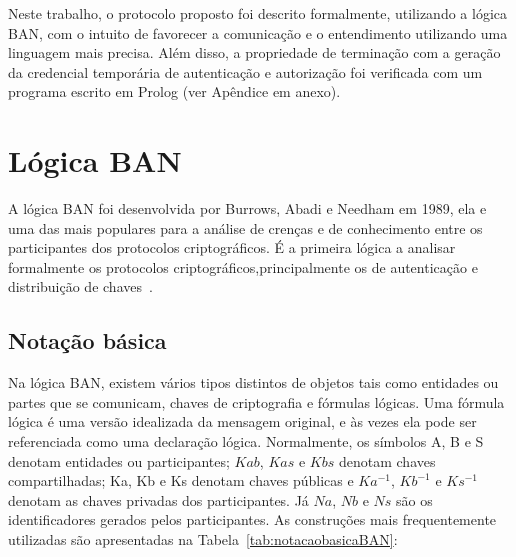 Neste trabalho, o protocolo proposto foi descrito formalmente, utilizando a lógica BAN, com o intuito de favorecer a comunicação e o entendimento utilizando uma linguagem mais precisa. Além disso, a propriedade de terminação com a geração da credencial temporária de autenticação e autorização foi verificada com um programa escrito em Prolog (ver Apêndice em anexo).


\section{Lógica BAN}

A lógica BAN foi desenvolvida por Burrows, Abadi e Needham em 1989, ela e uma das mais populares para a análise de crenças e de conhecimento entre os participantes dos protocolos criptográficos. É a primeira lógica a analisar formalmente os protocolos criptográficos,principalmente os de autenticação e distribuição de chaves~\cite{Burrows1990}.

\subsection{Notação básica}
Na lógica BAN, existem vários tipos distintos de objetos tais como entidades ou partes que se comunicam, chaves de criptografia e fórmulas lógicas. Uma fórmula lógica é uma versão idealizada da mensagem original, e às vezes ela pode ser referenciada como uma declaração lógica. Normalmente, os símbolos A, B e S denotam entidades ou participantes; $Kab$, $Kas$ e $Kbs$ denotam chaves compartilhadas; Ka, Kb e Ks denotam chaves públicas e $Ka^{-1}$, $Kb^{-1}$ e $Ks^{-1}$ denotam as chaves privadas dos participantes. Já $Na$, $Nb$ e $Ns$ são os identificadores gerados pelos participantes. As construções mais frequentemente utilizadas são apresentadas na Tabela~\ref{tab:notacaobasicaBAN}:

 \newcommand{\RHQuery}{\textbf{[???]}}
\newcommand{\RHRemark}[1]{\textbf{[#1]}}
\newcommand{\Believess}[2]{{#1}\mathrel{\textbf{\mid\equiv}}{#2}}
\newcommand{\Seess}[2]{{#1}\mathrel{\textbf{\triangleleft}}{#2}}
\newcommand{\Saids}[2]{{#1}\mathrel{\textbf{\mid\sim}}{#2}}

\newcommand{\Believes}[2]{{#1}\mathrel{\textbf{acredita}}{#2}}
\newcommand{\Sees}[2]{{#1}\mathrel{\textbf{recebeu}}{#2}}
\newcommand{\Said}[2]{{#1}\mathrel{\textbf{disse}}{#2}}
\newcommand{\Controls}[2]{{#1}\mathrel{\textbf{controla}}{#2}}
\newcommand{\Fresh}[1]{{#1}\,\textbf{novo}}
\newcommand{\Share}[3]{{#1}\stackrel{#2}{\longleftrightarrow}{#3}}
\newcommand{\ShareSecret}[3]{{#1}\stackrel{#2}{\rightleftharpoons}{#3}}
\newcommand{\PubKey}[2]{{}\stackrel{#1}{\mapsto}{#2}}
\newcommand{\Secret}[3]{{#1}\stackrel{#2}{\leftrightharpoons}{#3}}
\newcommand{\Encrypt}[2]{\{\,{#1}\,\}_{#2}}
\newcommand{\EncryptFrom}[3]{\{\,{#1}\,\}_{#2}^{#3}}
\newcommand{\Attach}[2]{\langle {#1}\rangle_{#2}}

